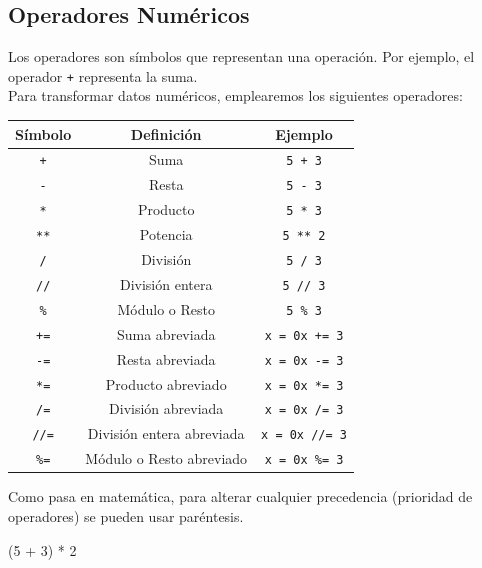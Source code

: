 \documentclass[
  letterpaper,
  DIV=11,
  numbers=noendperiod]{scrreprt}
\newenvironment{Shaded}{\begin{snugshade}}{\end{snugshade}}
\newcommand{\DecValTok}[1]{\textcolor[rgb]{0.68,0.00,0.00}{#1}}
\newcommand{\NormalTok}[1]{\textcolor[rgb]{0.00,0.23,0.31}{#1}}
\newcommand{\OperatorTok}[1]{\textcolor[rgb]{0.37,0.37,0.37}{#1}}
\begin{document}
\subsection{Operadores Numéricos}\label{operadores-numuxe9ricos}

Los operadores son símbolos que representan una operación. Por ejemplo,
el operador \texttt{+} representa la suma.\\

Para transformar datos numéricos, emplearemos los siguientes operadores:

\begin{longtable}[]{@{}ccc@{}}
\toprule\noalign{}
Símbolo & Definición & Ejemplo \\
\midrule\noalign{}
\endhead
\bottomrule\noalign{}
\endlastfoot
\texttt{+} & Suma & \texttt{5\ +\ 3} \\
\texttt{-} & Resta & \texttt{5\ -\ 3} \\
\texttt{*} & Producto & \texttt{5\ *\ 3} \\
\texttt{**} & Potencia & \texttt{5\ **\ 2} \\
\texttt{/} & División & \texttt{5\ /\ 3} \\
\texttt{//} & División entera & \texttt{5\ //\ 3} \\
\texttt{\%} & Módulo o Resto & \texttt{5\ \%\ 3} \\
\texttt{+=} & Suma abreviada & \texttt{x\ =\ 0}\texttt{x\ +=\ 3} \\
\texttt{-=} & Resta abreviada & \texttt{x\ =\ 0}\texttt{x\ -=\ 3} \\
\texttt{*=} & Producto abreviado & \texttt{x\ =\ 0}\texttt{x\ *=\ 3} \\
\texttt{/=} & División abreviada & \texttt{x\ =\ 0}\texttt{x\ /=\ 3} \\
\texttt{//=} & División entera abreviada &
\texttt{x\ =\ 0}\texttt{x\ //=\ 3} \\
\texttt{\%=} & Módulo o Resto abreviado &
\texttt{x\ =\ 0}\texttt{x\ \%=\ 3} \\
\end{longtable}

Como pasa en matemática, para alterar cualquier precedencia (prioridad
de operadores) se pueden usar paréntesis.

\begin{Shaded}
\begin{Highlighting}[]
\NormalTok{(}\DecValTok{5} \OperatorTok{+} \DecValTok{3}\NormalTok{) }\OperatorTok{*} \DecValTok{2}
\end{Highlighting}
\end{Shaded}
\end{document}
